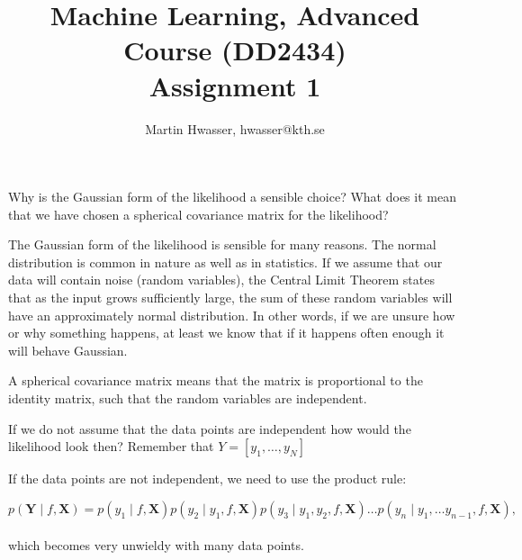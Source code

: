 \documentclass[12pt]{article}
\newenvironment{question}[2][Question]{\begin{trivlist}
\kern10pt
\item[\hskip \labelsep {\bfseries #1}\hskip \labelsep {\bfseries #2.}]}{\end{trivlist}}
\newcommand*{\answer}{%
  \par
  \kern1pt
  \begingroup
    \centering
    \raisebox{.2\baselineskip}{%
      \textcolor{gray}{
	    \rule{.6667\linewidth}{.1pt}%
      }
    }%
    \par
  \kern8pt
  \endgroup
}
\begin{document}
 
\graphicspath{ {img/} }
 
 
\title{Machine Learning, Advanced Course (DD2434)\\
		Assignment 1}
\author{Martin Hwasser, hwasser@kth.se}
 
\maketitle

\begin{question}{1}
Why is the Gaussian form of the likelihood a sensible choice? What does it mean that we have chosen a spherical covariance matrix for the likelihood?

\answer
The Gaussian form of the likelihood is sensible for many reasons. The normal distribution is common in nature as well as in statistics.
If we assume that our data will contain noise (random variables), the Central Limit Theorem states that as the input grows sufficiently large, the sum of these random variables will have an approximately normal distribution. In other words, if we are unsure how or why something happens, at least we know that if it happens often enough it will behave Gaussian.

A spherical covariance matrix means that the matrix is proportional to the identity matrix, such that the random variables are independent.
\end{question}

\begin{question}{2}
If we do not assume that the data points are independent how would the likelihood look then? Remember that $Y = [y_1, \ldots , y_N ]$
\answer

If the data points are not independent, we need to use the product rule:

\begin{equation}
p(\boldsymbol{Y} \mid f, \boldsymbol{X}) =
p(y_1 \mid f, \boldsymbol{X}) p(y_2 \mid y_1, f, \boldsymbol{X}) p(y_3 \mid y_1, y_2, f, \boldsymbol{X}) \ldots p(y_n \mid y_1, \ldots y_{n-1}, f, \boldsymbol{X}),
\end{equation}
\\which becomes very unwieldy with many data points.
\end{question}
\end{document}
